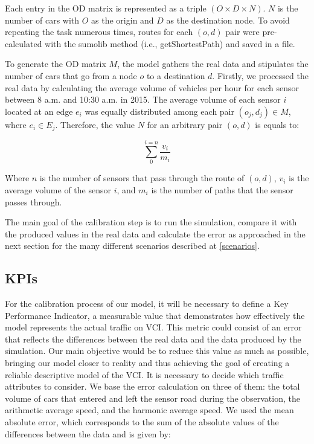 \documentclass[conference]{IEEEtran}
\begin{document}
Each entry in the OD matrix is represented as a triple $(O\times D \times N)$. $N$ is the number of cars with $O$ as the origin and $D$ as the destination node. To avoid repeating the task numerous times, routes for each $(o,d)$ pair were pre-calculated with the sumolib method (i.e., getShortestPath) and saved in a file. 

To generate the OD matrix $M$, the model gathers the real data and stipulates the number of cars that go from a node $o$ to a destination $d$. Firstly, we processed the real data by calculating the average volume of vehicles per hour for each sensor between 8 a.m. and 10:30 a.m. in 2015.
The average volume of each sensor $i$ located at an edge $e_i$ was equally distributed among each pair $(o_j, d_j) \in M$, where $e_i \in E_j$.  Therefore, the value $N$ for an arbitrary pair $(o,d)$ is equals to:

$$ \sum_{0}^{i=n} \frac{v_i}{m_i} $$

Where $n$ is the number of sensors that pass through the route of $(o,d)$, $v_i$ is the average volume of the sensor $i$, and $m_i$ is the number of paths that the sensor passes through. 

The main goal of the calibration step is to run the simulation, compare it with the produced values in the real data and calculate the error as approached in the next section for the many different scenarios described at \ref{scenarios}.

\subsection{KPIs}

For the calibration process of our model, it will be necessary to define a  Key Performance Indicator, a measurable value that demonstrates how effectively the model represents the actual traffic on VCI.
This metric could consist of an error that reflects the differences between the real data and the data produced by the simulation. Our main objective would be to reduce this value as much as possible, bringing our model closer to reality and thus achieving the goal of creating a reliable descriptive model of the VCI.
It is necessary to decide which traffic attributes to consider. We base the error calculation on three of them: the total volume of cars that entered and left the sensor road during the observation, the arithmetic average speed, and the harmonic average speed.
We used the mean absolute error, which corresponds to the sum of the absolute values of the differences between the data and is given by:
\end{document}
